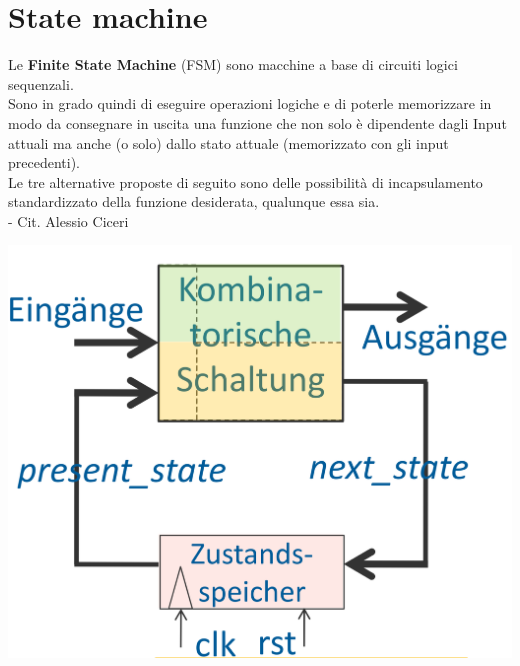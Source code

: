 \section{State machine}
    \begin{minipage}[t]{0.48\columnwidth}
        \vspace{0pt} %
        Le \textbf{Finite State Machine} (FSM) sono macchine a base di circuiti logici sequenzali.\\
        Sono in grado quindi 
        di eseguire operazioni logiche e di poterle memorizzare in modo da consegnare in uscita una funzione
        che non solo è dipendente dagli Input attuali ma anche (o solo) dallo stato attuale (memorizzato con gli input precedenti).\\
        Le tre alternative proposte di seguito sono delle possibilità di incapsulamento standardizzato
        della funzione desiderata, qualunque essa sia.\\
        - Cit. Alessio Ciceri
    \end{minipage}
    \hfill
    \begin{minipage}[t]{0.48\columnwidth}
        \vspace{0pt} %
        \includegraphics[width=\linewidth]{Images/FSMGeneralizzata.png}
    \end{minipage}%



